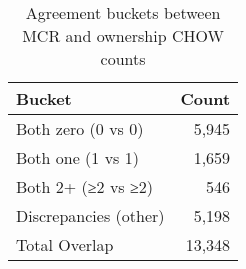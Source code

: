 \begin{table}
\caption{Agreement buckets between MCR and ownership CHOW counts}
\label{tab:chow_agreement_summary}
\begin{tabular}{lr}
\toprule
Bucket & Count \\
\midrule
Both zero (0 vs 0) & 5,945 \\
Both one (1 vs 1) & 1,659 \\
Both 2+ (≥2 vs ≥2) & 546 \\
Discrepancies (other) & 5,198 \\
Total Overlap & 13,348 \\
\bottomrule
\end{tabular}
\end{table}

